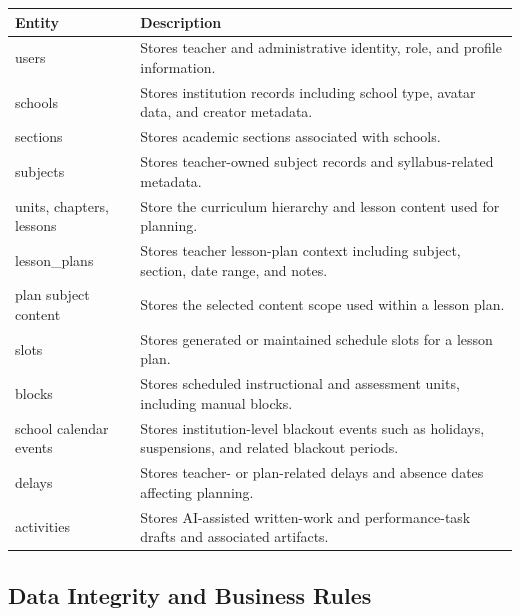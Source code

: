 \documentclass[12pt]{article}
\begin{document}
\begin{longtable}{|L{3.2cm}|L{9.8cm}|}
\hline
\textbf{Entity} & \textbf{Description} \\
\hline
users & Stores teacher and administrative identity, role, and profile information. \\
\hline
schools & Stores institution records including school type, avatar data, and creator metadata. \\
\hline
sections & Stores academic sections associated with schools. \\
\hline
subjects & Stores teacher-owned subject records and syllabus-related metadata. \\
\hline
units, chapters, lessons & Store the curriculum hierarchy and lesson content used for planning. \\
\hline
lesson\_plans & Stores teacher lesson-plan context including subject, section, date range, and notes. \\
\hline
plan subject content & Stores the selected content scope used within a lesson plan. \\
\hline
slots & Stores generated or maintained schedule slots for a lesson plan. \\
\hline
blocks & Stores scheduled instructional and assessment units, including manual blocks. \\
\hline
school calendar events & Stores institution-level blackout events such as holidays, suspensions, and related blackout periods. \\
\hline
delays & Stores teacher- or plan-related delays and absence dates affecting planning. \\
\hline
activities & Stores AI-assisted written-work and performance-task drafts and associated artifacts. \\
\hline
\end{longtable}

\subsection{Data Integrity and Business Rules}
\end{document}
